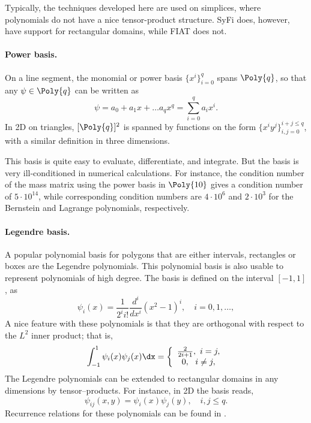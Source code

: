 Typically, the techniques developed here are used on simplices, where
polynomials do not have a nice tensor-product structure.  SyFi does,
however, have support for rectangular domains, while FIAT does not.

\paragraph{Power basis.}
On a line segment, the monomial or power basis $\{ x^i \}_{i=0}^{q}$
spans $\Poly{q}$, so that any $\psi \in \Poly{q}$ can be written as
\begin{equation}
\label{pn1d}
\psi = a_0 + a_1 x + \ldots a_q x^q = \sum^q_{i=0} a_i x^i.
\end{equation}
In 2D on triangles, $[\Poly{q}]^2$ is spanned by functions on the form $\{
x^i y^j \}_{i,j=0}^{i+j\leqslant q}$, with a similar definition in three
dimensions.

This basis is quite easy to evaluate, differentiate, and integrate. But
the basis is very ill-conditioned in numerical calculations.
For instance, the condition number of the mass matrix using the power
basis in $\Poly{10}$ gives a condition number of $5\cdot10^{14}$, while
corresponding condition numbers are $4\cdot 10^6$ and $2\cdot 10^3$
for the Bernstein and Lagrange polynomials, respectively.

\paragraph{Legendre basis.}

A popular polynomial basis for polygons that are either intervals,
rectangles or boxes are the Legendre polynomials.  This polynomial basis
is also usable to represent polynomials of high degree.  The basis is
defined on the interval $[-1,1]$, as
\begin{equation}
\psi_i(x) = \frac{1}{2^i i!} \frac{d^i}{dx^i} (x^2 -1)^i, \quad i=0,1,\ldots,
\end{equation}
A nice feature with these polynomials is that they are orthogonal with
respect to the $L^2$ inner product; that is,
\begin{equation}
\int_{-1}^1 \psi_i (x) \psi_j(x) \dx  =
\left\{
\begin{array}{c}
\frac{2}{2i+1}, \ i=j, \\
0 , \ \ i\not= j, \\
\end{array}
\right.
\end{equation}
The Legendre polynomials can be extended to rectangular domains in any
dimensions by tensor--products.  For instance, in 2D the basis reads,
\begin{equation}
\psi_{ij}(x,y) = \psi_i(x) \psi_j(y) ,   \quad i,j \leqslant q.
\end{equation}
Recurrence relations for these polynomials can be found in
\citet{KarniadakisSherwin2005}.


